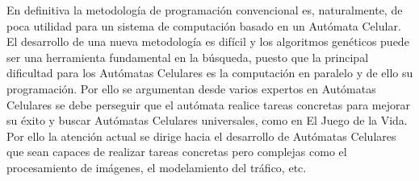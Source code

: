 En definitiva la metodología de programación convencional es, naturalmente, de poca utilidad para un sistema de computación basado en un Autómata Celular. El desarrollo de una nueva metodología es difícil y los algoritmos genéticos puede ser una herramienta fundamental en la búsqueda, puesto que la principal dificultad para los Autómatas Celulares es la computación en paralelo y de ello su programación. Por ello se argumentan desde varios expertos en Autómatas Celulares se debe perseguir que el autómata realice tareas concretas para mejorar su éxito y buscar Autómatas Celulares universales, como en El Juego de la Vida. Por ello la atención actual se dirige hacia el desarrollo de Autómatas Celulares que sean capaces de realizar tareas concretas pero complejas como el procesamiento de imágenes, el modelamiento del tráfico, etc.







